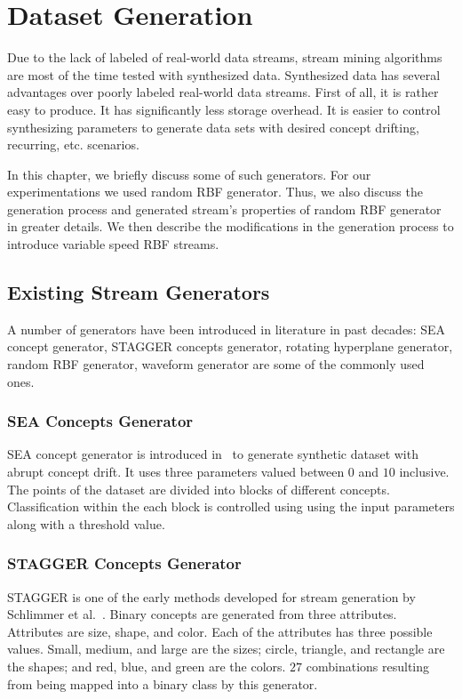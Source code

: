 \chapter{Dataset Generation}
\label{chp:dataset}
Due to the lack of labeled of real-world data streams, stream mining algorithms are most of the time tested with synthesized data. Synthesized data has several advantages over poorly labeled real-world data streams. First of all, it is rather easy to produce. It has significantly less storage overhead. It is easier to control synthesizing parameters to generate data sets with desired concept drifting, recurring, etc. scenarios.

In this chapter, we briefly discuss some of such generators. For our experimentations we used random RBF generator. Thus, we also discuss the generation process and generated stream's properties of random RBF generator in greater details. We then describe the modifications in the generation process to introduce variable speed RBF streams.

\section{Existing Stream Generators}
A number of generators have been introduced in literature in past decades: SEA concept generator, STAGGER concepts generator, rotating hyperplane generator, random RBF generator, waveform generator are some of the commonly used ones. 

\subsection*{SEA Concepts Generator}
SEA concept generator is introduced in~\cite{street01:sea} to generate synthetic dataset with abrupt concept drift. It uses three parameters valued between $0$ and $10$ inclusive. The points of the dataset are divided into blocks of different concepts. Classification within the each block is controlled using using the input parameters along with a threshold value.

\subsection*{STAGGER Concepts Generator}
STAGGER is one of the early methods developed for stream generation by Schlimmer et al.~\cite{schlimmer86:stagger}. Binary concepts are generated from three attributes. Attributes are size, shape, and color. Each of the attributes has three possible values. Small, medium, and large are the sizes; circle, triangle, and rectangle are the shapes; and red, blue, and green are the colors. $27$ combinations resulting from being mapped into a binary class by this generator.

